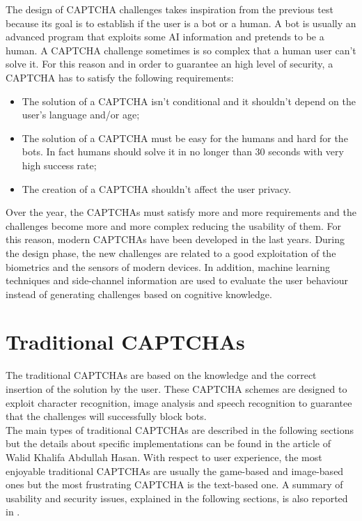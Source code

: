 The design of CAPTCHA challenges takes inspiration from the previous test because its goal is to establish if the user is a bot or a human. A bot is usually an advanced program that exploits some AI information and pretends to be a human. A CAPTCHA challenge sometimes is so complex that a human user can't solve it. For this reason and in order to guarantee an high level of security, a CAPTCHA has to satisfy the following requirements:
\begin{itemize}
	\item{The solution of a CAPTCHA isn't conditional and it shouldn't depend on the user's language and/or age;}
	\item{The solution of a CAPTCHA must be easy for the humans and hard for the bots. In fact humans should solve it in no longer than 30 seconds with very high success rate;}
	\item{The creation of a CAPTCHA shouldn't affect the user privacy.}
\end{itemize}
Over the year, the CAPTCHAs must satisfy more and more requirements and the challenges become more and more complex reducing the usability of them. For this reason, modern CAPTCHAs have been developed in the last years. During the design phase, the new challenges are related to a good exploitation of the biometrics and the sensors of modern devices. In addition, machine learning techniques and side-channel information are used to evaluate the user behaviour instead of generating challenges based on cognitive knowledge. 

\section{Traditional CAPTCHAs}
The traditional CAPTCHAs are based on the knowledge and the correct insertion of the solution by the user. These CAPTCHA schemes are designed to exploit character recognition, image analysis and speech recognition to guarantee that the challenges will successfully block bots.\\
The main types of traditional CAPTCHAs are described in the following sections but the details about specific implementations can be found in the article of Walid Khalifa Abdullah Hasan\cite{survey_advanced_CAPTCHA}. With respect to user experience, the most enjoyable traditional CAPTCHAs are usually the game-based and image-based ones but the most frustrating CAPTCHA is the text-based one\cite{usability_CAPTCHA}. A summary of usability and security issues, explained in the following sections, is also reported in .

